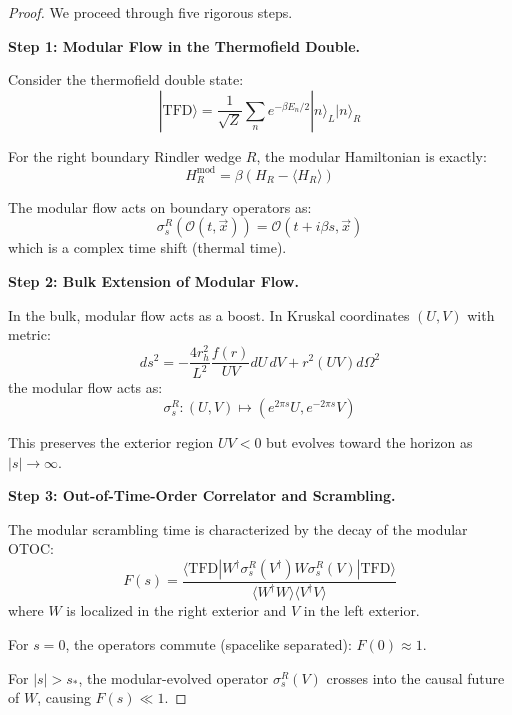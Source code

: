 \documentclass[12pt,a4paper]{article}
\begin{document}
\begin{proof}
We proceed through five rigorous steps.

\textbf{Step 1: Modular Flow in the Thermofield Double.}

Consider the thermofield double state:
\begin{equation}
|\text{TFD}\rangle = \frac{1}{\sqrt{Z}} \sum_n e^{-\beta E_n/2} |n\rangle_L |n\rangle_R
\end{equation}

For the right boundary Rindler wedge $R$, the modular Hamiltonian is exactly:
\begin{equation}
H_R^{\text{mod}} = \beta (H_R - \langle H_R \rangle)
\end{equation}

The modular flow acts on boundary operators as:
\begin{equation}
\sigma_s^R(\mathcal{O}(t, \vec{x})) = \mathcal{O}(t + i\beta s, \vec{x})
\end{equation}
which is a complex time shift (thermal time).

\textbf{Step 2: Bulk Extension of Modular Flow.}

In the bulk, modular flow acts as a boost. In Kruskal coordinates $(U, V)$ with metric:
\begin{equation}
ds^2 = -\frac{4r_h^2}{L^2} \frac{f(r)}{UV} dU \, dV + r^2(UV) d\Omega^2
\end{equation}
the modular flow acts as:
\begin{equation}
\sigma_s^R: (U, V) \mapsto (e^{2\pi s} U, e^{-2\pi s} V)
\end{equation}

This preserves the exterior region $UV < 0$ but evolves toward the horizon as $|s| \to \infty$.

\textbf{Step 3: Out-of-Time-Order Correlator and Scrambling.}

The modular scrambling time is characterized by the decay of the modular OTOC:
\begin{equation}
F(s) = \frac{\langle \text{TFD} | W^\dagger \sigma_s^R(V^\dagger) W \sigma_s^R(V) | \text{TFD} \rangle}{\langle W^\dagger W \rangle \langle V^\dagger V \rangle}
\end{equation}
where $W$ is localized in the right exterior and $V$ in the left exterior.

For $s = 0$, the operators commute (spacelike separated): $F(0) \approx 1$.

For $|s| > s_*$, the modular-evolved operator $\sigma_s^R(V)$ crosses into the causal future of $W$, causing $F(s) \ll 1$.


\end{proof}
\end{document}
